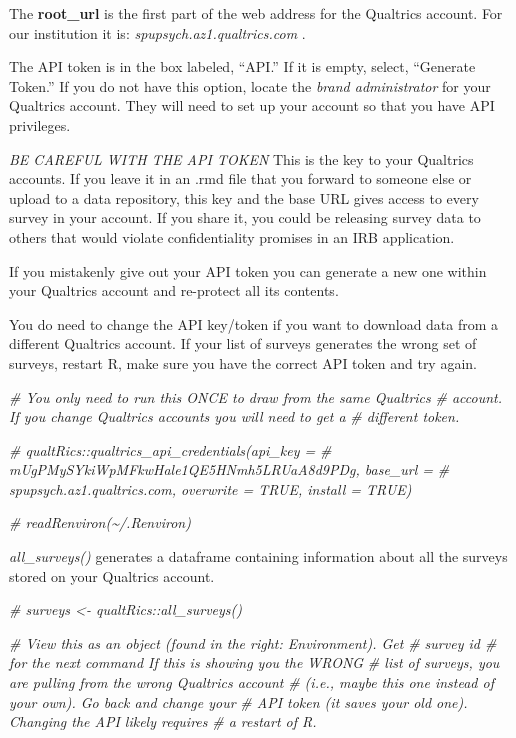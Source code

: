 \documentclass[
  11pt,
]{book}
\newenvironment{Shaded}{\begin{snugshade}}{\end{snugshade}}
\newcommand{\CommentTok}[1]{\textcolor[rgb]{0.37,0.37,0.37}{\textit{#1}}}
\begin{document}
The \textbf{root\_url} is the first part of the web address for the Qualtrics account. For our institution it is: \emph{spupsych.az1.qualtrics.com }.

The API token is in the box labeled, ``API.'' If it is empty, select, ``Generate Token.'' If you do not have this option, locate the \emph{brand administrator} for your Qualtrics account. They will need to set up your account so that you have API privileges.

\emph{BE CAREFUL WITH THE API TOKEN} This is the key to your Qualtrics accounts. If you leave it in an .rmd file that you forward to someone else or upload to a data repository, this key and the base URL gives access to every survey in your account. If you share it, you could be releasing survey data to others that would violate confidentiality promises in an IRB application.

If you mistakenly give out your API token you can generate a new one within your Qualtrics account and re-protect all its contents.

You do need to change the API key/token if you want to download data from a different Qualtrics account. If your list of surveys generates the wrong set of surveys, restart R, make sure you have the correct API token and try again.

\begin{Shaded}
\begin{Highlighting}[]
\CommentTok{\# You only need to run this ONCE to draw from the same Qualtrics}
\CommentTok{\# account. If you change Qualtrics accounts you will need to get a}
\CommentTok{\# different token.}

\CommentTok{\# qualtRics::qualtrics\_api\_credentials(api\_key =}
\CommentTok{\# \textquotesingle{}mUgPMySYkiWpMFkwHale1QE5HNmh5LRUaA8d9PDg\textquotesingle{}, base\_url =}
\CommentTok{\# \textquotesingle{}spupsych.az1.qualtrics.com\textquotesingle{}, overwrite = TRUE, install = TRUE)}

\CommentTok{\# readRenviron(\textquotesingle{}\textasciitilde{}/.Renviron\textquotesingle{})}
\end{Highlighting}
\end{Shaded}

\emph{all\_surveys()} generates a dataframe containing information about all the surveys stored on your Qualtrics account.

\begin{Shaded}
\begin{Highlighting}[]
\CommentTok{\# surveys \textless{}{-} qualtRics::all\_surveys()}

\CommentTok{\# View this as an object (found in the right: Environment).  Get}
\CommentTok{\# survey id \# for the next command If this is showing you the WRONG}
\CommentTok{\# list of surveys, you are pulling from the wrong Qualtrics account}
\CommentTok{\# (i.e., maybe this one instead of your own). Go back and change your}
\CommentTok{\# API token (it saves your old one). Changing the API likely requires}
\CommentTok{\# a restart of R.}
\end{Highlighting}
\end{Shaded}
\end{document}
